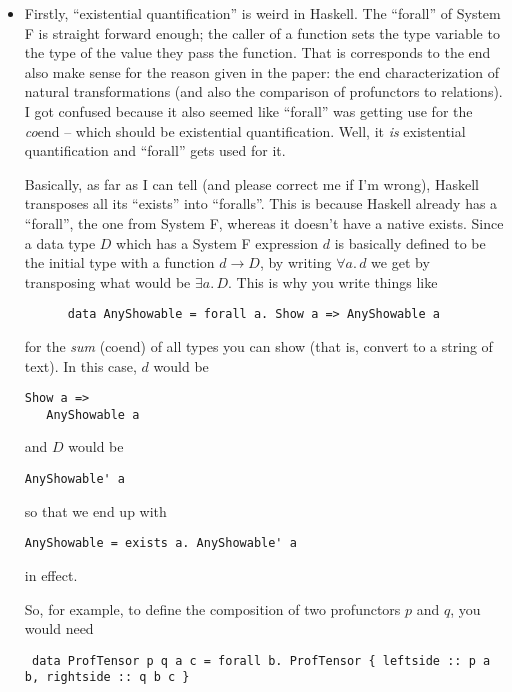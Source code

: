 \documentclass{amsart}
\begin{document}
\begin{itemize}
\item Firstly, ``existential quantification'' is weird in Haskell. The
  ``forall'' of System F is straight forward enough; the caller of a function
  sets the type variable to the type of the value they pass the function. That
  is corresponds to the end also make sense for the reason given in the paper:
  the end characterization of natural transformations (and also the comparison
  of profunctors to relations). I got confused because it
  also seemed like ``forall'' was getting use for the \emph{co}end -- which
  should be existential quantification. Well, it \emph{is} existential
  quantification and ``forall'' gets used for it.

  Basically, as far as I can tell (and please correct me if I'm wrong), Haskell
  transposes all its ``exists'' into ``foralls''. This is because Haskell
  already has a ``forall'', the one from System F, whereas it doesn't have a
  native exists. Since a data type $D$ which has a System F expression $d$ is
  basically defined to be the initial type with a function $d \to D$, by writing
  $\forall a.\, d$ we get by transposing what would be $\exists a.\, D$. This is
  why you write things like
  \begin{center}
    \begin{verbatim}
      data AnyShowable = forall a. Show a => AnyShowable a
    \end{verbatim}
  \end{center}
   for the \emph{sum} (coend) of all types you can show (that is, convert to a
   string of text). In this case, $d$ would be
   \begin{verbatim}Show a =>
   AnyShowable a\end{verbatim} and $D$ would be
   \begin{verbatim}AnyShowable' a\end{verbatim} so that we end up with
   \begin{verbatim}AnyShowable = exists a. AnyShowable' a\end{verbatim} in effect.
 
   So, for example, to define the composition of two profunctors $p$ and $q$, you would
   need
   \begin{center}
     \begin{verbatim} data ProfTensor p q a c = forall b. ProfTensor { leftside :: p a b, rightside :: q b c }
     \end{verbatim}
   \end{center}


\end{itemize}
\end{document}
